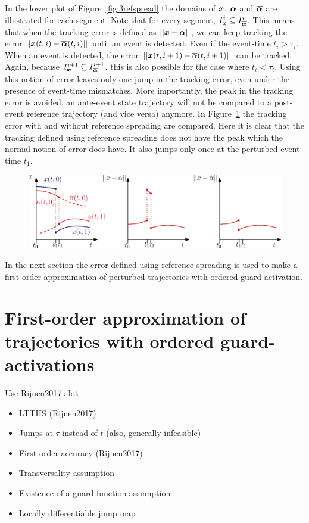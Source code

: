 \documentclass[../DC2017114Bouma.tex]{subfiles}
\begin{document}
In the lower plot of Figure~\ref{fig:3refspread} the domains of ${\boldsymbol{x}}$, $\boldsymbol{\alpha}$ and $\overline{\boldsymbol{\alpha}}$ are illustrated for each segment. Note that for every segment, $I_{{\boldsymbol{x}}}^i\subseteq I_{\overline{\boldsymbol{\alpha}}}^i$. This means that when the tracking error is defined as $||{\boldsymbol{x}}-\overline{\boldsymbol{\alpha}}||$, we can keep tracking the error $||{\boldsymbol{x}}(t,i)-\overline{\boldsymbol{\alpha}}(t,i)||$ until an event is detected. Even if the event-time $t_i>\tau_i$. When an event is detected, the error  $||{\boldsymbol{x}}(t,i+1)-\overline{\alpha}(t,i+1)||$ can be tracked. Again, because $I_{{\boldsymbol{x}}}^{i+1}\subseteq I_{\overline{\boldsymbol{\alpha}}}^{i+1}$, this is also possible for the case where $t_i<\tau_i$. Using this notion of error leaves only one jump in the tracking error, even under the presence of event-time mismatches. More importantly, the peak in the tracking error is avoided, an ante-event state trajectory will not be compared to a post-event reference trajectory (and vice versa) anymore. In Figure~\ref{fig:3refspreaderrors} the tracking error with and without reference spreading are compared. Here it is clear that the tracking defined using reference spreading does not have the peak which the normal notion of error does have. It also jumps only once at the perturbed event-time $t_1$.
\begin{figure}[h]
\centering
\includegraphics[width=\textwidth]{refspreaderrors.eps}\caption{} \label{fig:3refspreaderrors}
\end{figure}

In the next section the error defined using reference spreading is used to make a first-order approximation of perturbed trajectories with ordered guard-activation.
\section{First-order approximation of trajectories with ordered guard-activations}


Use Rijnen2017 alot
\begin{itemize}
\item LTTHS (Rijnen2017)
\item Jumps at $\tau$ instead of $t$ (also, generally infeasible)
\item First-order accuracy (Rijnen2017)
\item Transversality assumption
\item Existence of a guard function assumption
\item Locally differentiable jump map
\end{itemize}
\end{document}
